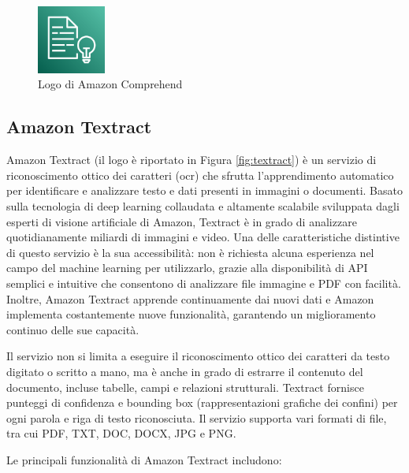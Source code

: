 \begin{figure}[h]
  \centering
  \includegraphics[width=0.2\textwidth]{img/tecnologie/comprehend.png}
  \caption{Logo di Amazon Comprehend}
  \label{fig:comprehend}
\end{figure}

\subsection{Amazon Textract}
Amazon Textract (il logo è riportato in Figura \ref{fig:textract}) è un servizio di riconoscimento ottico dei caratteri (\gls{ocr}) che sfrutta l'apprendimento automatico per identificare e analizzare testo e dati presenti in immagini o documenti. Basato sulla tecnologia di deep learning collaudata e altamente scalabile sviluppata dagli esperti di visione artificiale di Amazon, Textract è in grado di analizzare quotidianamente miliardi di immagini e video. Una delle caratteristiche distintive di questo servizio è la sua accessibilità: non è richiesta alcuna esperienza nel campo del machine learning per utilizzarlo, grazie alla disponibilità di API semplici e intuitive che consentono di analizzare file immagine e PDF con facilità. Inoltre, Amazon Textract apprende continuamente dai nuovi dati e Amazon implementa costantemente nuove funzionalità, garantendo un miglioramento continuo delle sue capacità.

Il servizio non si limita a eseguire il riconoscimento ottico dei caratteri da testo digitato o scritto a mano, ma è anche in grado di estrarre il contenuto del documento, incluse tabelle, campi e relazioni strutturali. Textract fornisce punteggi di confidenza e bounding box (rappresentazioni grafiche dei confini) per ogni parola e riga di testo riconosciuta. Il servizio supporta vari formati di file, tra cui PDF, TXT, DOC, DOCX, JPG e PNG.

Le principali funzionalità di Amazon Textract includono:

